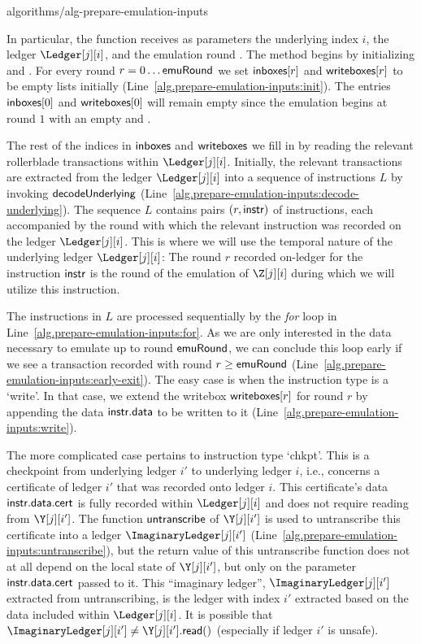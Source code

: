 {algorithms/alg-prepare-emulation-inputs}

In particular, the function \prepareEmulationInputs receives as parameters
the underlying index $i$, the ledger $\Ledger[j][i]$,
and the emulation round \emulationRound.
The method begins by initializing \inboxes and \writeboxes. For every round $r = 0 \ldots \textsf{emuRound}$ we set
$\textsf{inboxes}[r]$ and $\textsf{writeboxes}[r]$ to be empty lists initially (Line~\ref{alg.prepare-emulation-inputs:init}).
The entries $\textsf{inboxes}[0]$ and $\textsf{writeboxes}[0]$ will remain empty
since the emulation begins at round $1$ with an empty \inbox and \writebox.

The rest of the indices in $\textsf{inboxes}$
and $\textsf{writeboxes}$ we fill in by reading the relevant rollerblade transactions within $\Ledger[j][i]$.
Initially, the relevant transactions are extracted from the ledger $\Ledger[j][i]$ into a sequence
of instructions $L$ by invoking $\textsf{decodeUnderlying}$ (Line~\ref{alg.prepare-emulation-inputs:decode-underlying}).
The sequence $L$ contains pairs $(r, \textsf{instr})$ of instructions, each accompanied by the round with which
the relevant instruction was recorded on the ledger $\Ledger[j][i]$. This is where we will use the temporal
nature of the underlying ledger $\Ledger[j][i]$: The round $r$ recorded on-ledger for the instruction
$\textsf{instr}$ is the round of the emulation of $\Z[j][i]$ during which we will utilize this instruction.

The instructions in $L$ are processed sequentially by the \emph{for} loop in Line~\ref{alg.prepare-emulation-inputs:for}.
As we are only interested in the data necessary to emulate up to round $\textsf{emuRound}$, we can conclude this loop
early if we see a transaction recorded with round $r \geq \textsf{emuRound}$ (Line~\ref{alg.prepare-emulation-inputs:early-exit}).
The easy case is when the instruction type is a `write'. In that case, we extend the writebox $\textsf{writeboxes}[r]$
for round $r$ by appending the data $\textsf{instr}.\textsf{data}$ to be written to it (Line~\ref{alg.prepare-emulation-inputs:write}).

The more complicated case pertains to instruction type `chkpt'. This is a checkpoint from underlying
ledger $i'$ to underlying ledger $i$, i.e., concerns a certificate of ledger $i'$ that was recorded onto
ledger $i$. This certificate's data $\textsf{instr}.\textsf{data}.\textsf{cert}$ is fully recorded within $\Ledger[j][i]$
and does not require reading from $\Y[j][i']$. The function $\textsf{untranscribe}$ of $\Y[j][i']$ is used to untranscribe
this certificate into a ledger $\ImaginaryLedger[j][i']$ (Line~\ref{alg.prepare-emulation-inputs:untranscribe}),
but the return value of this untranscribe function does not at all depend on the local state of $\Y[j][i']$,
but only on the parameter $\textsf{instr}.\textsf{data}.\textsf{cert}$ passed to it. This ``imaginary ledger'',
$\ImaginaryLedger[j][i']$ extracted from untranscribing, is the ledger with index $i'$ extracted
based on the data included within $\Ledger[j][i]$. It is possible that
$\ImaginaryLedger[j][i'] \neq \Y[j][i'].\lread()$ (especially if ledger $i'$ is unsafe).

